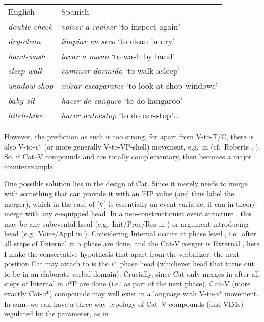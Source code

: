 \documentclass[output=paper]{langsci/langscibook}
\begin{document}
\ea\label{ex:spa}
{\upshape
\begin{tabular}[t]{ll}
English & Spanish\\
{\it double-check} & {\it volver a revisar} `to inspect again'\\
{\it dry-clean} & {\it limpiar en seco} `to clean in dry' \\
{\it hand-wash} & {\it lavar a mano} `to wash by hand'\\
{\it sleep-walk} & {\it caminar dormido} `to walk asleep' \\
{\it window-shop} & {\it mirar escaparates} `to look at shop windows'\\
{\it baby-sit} & {\it hacer de canguro} `to do kangaroo'\\
{\it hitch-hike} & {\it hacer autoestop} `to do car-stop'\dots \\
\end{tabular}}
\z

However, the prediction as such is too strong, for apart from V-to-T/C, there
is also V-to-{\em v}* (or more generally V-to-VP-shell) movement, e.g.\ in
 (cf.\ Roberts \citeyear{Roberts2010}, \citeyear{Roberts2019}).
So, if Cat--V compounds and  are totally complementary, then
 becomes a major counterexample.

One possible solution lies in the design of Cat. Since it merely needs to merge with something that can provide it with an \gls{FIP} value (and thus label the merger), which in the case of [V] is essentially an event variable, it can in theory merge with any $e$-equipped head. In a neo-constructionist event structure \citep[cf.][]{Acedo2016}, this may be any subevental head (e.g.\ Init/Proc/Res in \citealt{Ramchand2008}) or argument introducing head (e.g.\ Voice/Appl in \citealt{Pylkkanen2008}). Considering Internal  occurs at phase level \citep[cf.][]{Citko2014}, i.e.\ after all steps of External  in a phase are done, and the Cat\textsubscript{\textsurd}-V\textsubscript{\textsurd} merger is External , here I make the conservative hypothesis that apart from the verbalizer, the next position Cat may attach to is the {\em v}* phase head (whichever head that turns out to be in an elaborate verbal domain). Crucially, since Cat only merges in after all steps of Internal  in {\em v}*P are done (i.e.\ as part of the next phase), Cat--V (more exactly Cat-{\em v}*) compounds may well exist in a language with V-to-{\em v}* movement. In sum, we can have a three-way typology of Cat--V compounds (and \glspl{VIM}) regulated by the  parameter, as in .
\end{document}
